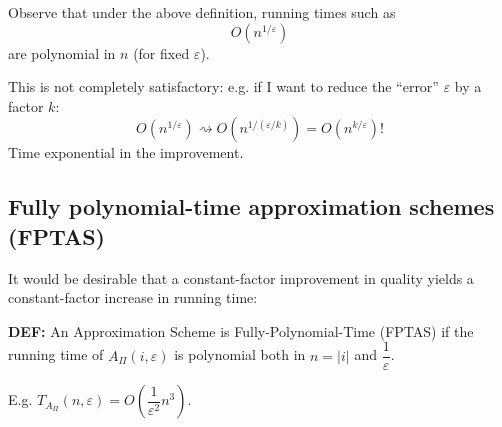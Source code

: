 Observe that under the above definition, running times such as
\[O(n^{1/\varepsilon})\]
are polynomial in $n$ (for fixed $\varepsilon$).

This is not completely satisfactory: e.g. if I want to reduce the ``error'' $\varepsilon$ by a factor $k$:
\[O(n^{1/\varepsilon})\rightsquigarrow O(n^{1/(\varepsilon/k)})=O(n^{k/\varepsilon})!\]
Time exponential in the improvement.

\subsection{Fully polynomial-time approximation schemes (FPTAS)}
It would be desirable that a constant-factor improvement in quality yields a constant-factor increase in running time:

\begin{notesdefinition}
\textbf{DEF:} An Approximation Scheme is Fully-Polynomial-Time (FPTAS) if the running time of $A_\Pi(i,\varepsilon)$ is polynomial both in $n=|i|$ and $\dfrac1\varepsilon$.
\end{notesdefinition}

E.g. $T_{A_\Pi}(n,\varepsilon)=O\left(\dfrac1{\varepsilon^2}n^3\right)$.
